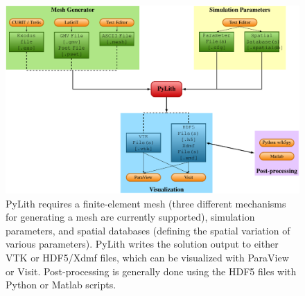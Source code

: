 \begin{figure}[htbp]
  \includegraphics[width=5in]{runpylith/figs/runpylith} 
  \caption{PyLith requires a finite-element mesh (three different
    mechanisms for generating a mesh are currently supported),
    simulation parameters, and spatial databases (defining the spatial
    variation of various parameters).  PyLith writes the solution
    output to either VTK or HDF5/Xdmf files, which can be visualized
    with ParaView or Visit. Post-processing is generally done using
    the HDF5 files with Python or Matlab scripts.}
\label{fig:pylith:workflow} 
\end{figure}











